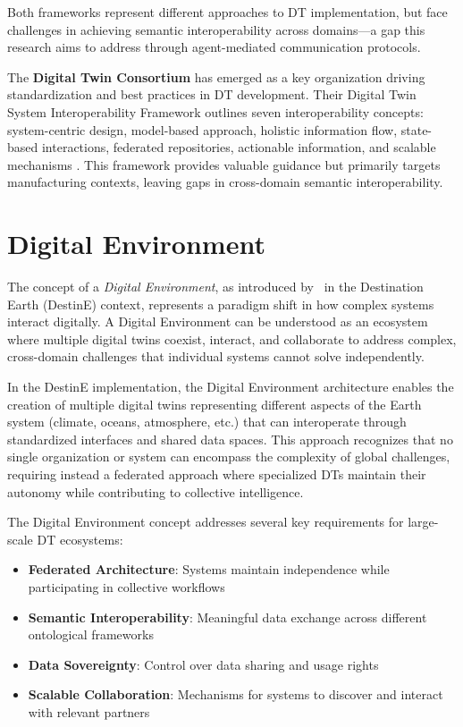 Both frameworks represent different approaches to DT implementation, but face challenges in achieving semantic interoperability across domains—a gap this research aims to address through agent-mediated communication protocols.

The \textbf{Digital Twin Consortium} has emerged as a key organization driving standardization and best practices in DT development. Their Digital Twin System Interoperability Framework outlines seven interoperability concepts: system-centric design, model-based approach, holistic information flow, state-based interactions, federated repositories, actionable information, and scalable mechanisms \cite{Budiardjo_2021}. This framework provides valuable guidance but primarily targets manufacturing contexts, leaving gaps in cross-domain semantic interoperability.

\section{Digital Environment}

The concept of a \emph{Digital Environment}, as introduced by~\cite{Nativi_2021} in the Destination Earth (DestinE) context, represents a paradigm shift in how complex systems interact digitally. A Digital Environment can be understood as an ecosystem where multiple digital twins coexist, interact, and collaborate to address complex, cross-domain challenges that individual systems cannot solve independently.

In the DestinE implementation, the Digital Environment architecture enables the creation of multiple digital twins representing different aspects of the Earth system (climate, oceans, atmosphere, etc.) that can interoperate through standardized interfaces and shared data spaces. This approach recognizes that no single organization or system can encompass the complexity of global challenges, requiring instead a federated approach where specialized DTs maintain their autonomy while contributing to collective intelligence.

The Digital Environment concept addresses several key requirements for large-scale DT ecosystems:
\begin{itemize}
    \item \textbf{Federated Architecture}: Systems maintain independence while participating in collective workflows
    \item \textbf{Semantic Interoperability}: Meaningful data exchange across different ontological frameworks
    \item \textbf{Data Sovereignty}: Control over data sharing and usage rights
    \item \textbf{Scalable Collaboration}: Mechanisms for systems to discover and interact with relevant partners
\end{itemize}

